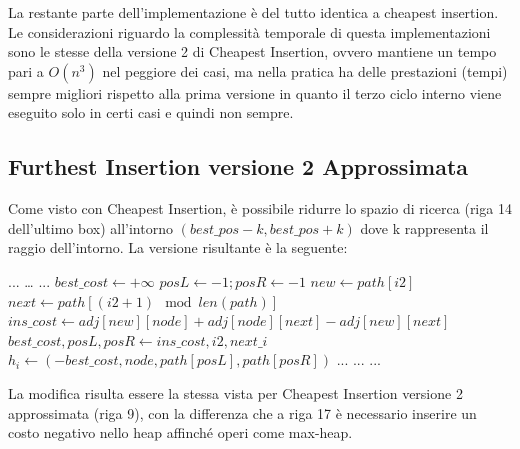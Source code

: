 \documentclass[a4paper,12pt]{report}
\begin{document}
La restante parte dell'implementazione è del tutto identica a cheapest insertion. \newline
Le considerazioni riguardo la complessità temporale di questa implementazioni sono le stesse della versione 2 di Cheapest Insertion, ovvero mantiene un tempo pari a $O(n^3)$ nel peggiore dei casi, ma nella pratica ha delle prestazioni (tempi) sempre migliori rispetto alla prima versione in quanto il terzo ciclo interno viene eseguito solo in certi casi e quindi non sempre.

\subsection{Furthest Insertion versione 2 Approssimata}
Come visto con Cheapest Insertion, è possibile ridurre lo spazio di ricerca (riga 14 dell'ultimo box) all'intorno $(best\_pos - k, best\_pos + k)$ dove k rappresenta il raggio dell'intorno. La versione risultante è la seguente:
\begin{tcolorbox}[colframe=black, colback=white, boxrule=0.5pt, title=Furthest Insertion Versione 2 Approssimata, coltitle=black, fonttitle=\bfseries, colbacktitle=white, breakable]
  \begin{algorithmic}[1]
    \State ...
      \State \dots
        \State ...
          \State $best\_cost \gets +\infty$
          \State $posL \gets -1; posR \gets -1$
            \State $new \gets path[i2]$
            \State $next \gets path[(i2 + 1) \mod len(path)]$
            \State $ins\_cost \gets adj[new][node] + adj[node][next] - adj[new][next]$
              \State $best\_cost, posL, posR \gets ins\_cost, i2, next\_i$
            \EndIf
          \EndFor
          \State $h_i \gets (-best\_cost, node, path[posL], path[posR])$
        \EndIf
        \State ...
      \EndFor
      \State ...
    \EndWhile
    \State ...
  \end{algorithmic}
\end{tcolorbox}
La modifica risulta essere la stessa vista per Cheapest Insertion versione 2 approssimata (riga 9), con la differenza che a riga 17 è necessario inserire un costo negativo nello heap affinché operi come max-heap.
\end{document}
